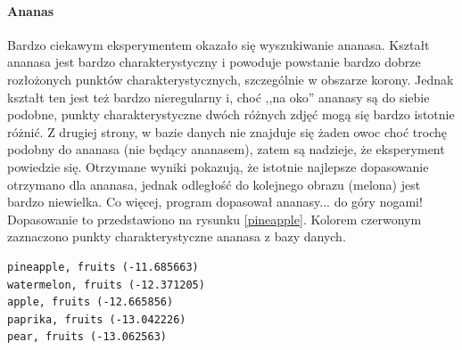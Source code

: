 \documentclass[a4paper,12pt,leqno]{article}
\begin{document}
\paragraph{Ananas}
Bardzo ciekawym eksperymentem okazało się wyszukiwanie ananasa. Kształt ananasa jest bardzo charakterystyczny i powoduje powstanie bardzo
dobrze rozłożonych punktów charakterystycznych, szczególnie w obszarze korony. Jednak kształt ten jest też bardzo nieregularny i, choć
,,na oko'' ananasy są do siebie podobne, punkty charakterystyczne dwóch różnych zdjęć mogą się bardzo istotnie różnić. Z drugiej strony,
w bazie danych nie znajduje się żaden owoc choć trochę podobny do ananasa (nie będący ananasem), zatem są nadzieje, że eksperyment powiedzie
się. Otrzymane wyniki pokazują, że istotnie najlepsze dopasowanie otrzymano dla ananasa, jednak odległość do kolejnego obrazu (melona) jest
bardzo niewielka. Co więcej, program dopasował ananasy... do góry nogami! Dopasowanie to przedstawiono na rysunku \ref{pineapple}. Kolorem
czerwonym zaznaczono punkty charakterystyczne ananasa z bazy danych.
\begin{verbatim}
pineapple, fruits (-11.685663)
watermelon, fruits (-12.371205)
apple, fruits (-12.665856)
paprika, fruits (-13.042226)
pear, fruits (-13.062563)
\end{verbatim}
\end{document}
